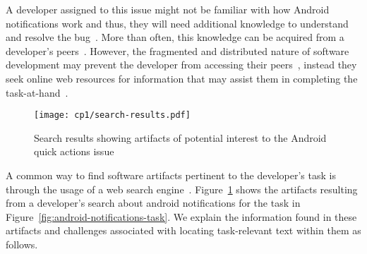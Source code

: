  
 \medskip
 A developer assigned to this issue might not be familiar with how Android notifications work and thus, they will need additional knowledge to understand and resolve the bug~\cite{ko2007, Li2013, sillito2006}. 
 More than often, this knowledge can be acquired from a developer's peers~\cite{singer2011}. 
 However, the fragmented and distributed nature of software development  
 may prevent the developer from accessing their peers~\cite{ko2007},
 instead they seek online web resources for information 
 that may assist them in completing the task-at-hand~\cite{Xia2017, rao2020}.
 
 
 
 
 
 \begin{figure}
     \centering
     \texttt{[image: cp1/search-results.pdf]}
     \caption{Search results showing artifacts of potential interest to the Android quick actions issue}
     \label{fig:android-search-results}
 \end{figure}
 
 
 
A common way to find software artifacts
pertinent to the developer's task
is through the usage of a web search engine~\cite{Brandt2009a, Li2013}.
Figure~\ref{fig:android-search-results}
shows the artifacts resulting from a developer's search 
about android notifications for the task in Figure~\ref{fig:android-notifications-task}.
We explain the information found in these artifacts
and challenges associated with locating 
task-relevant text within them as follows.






